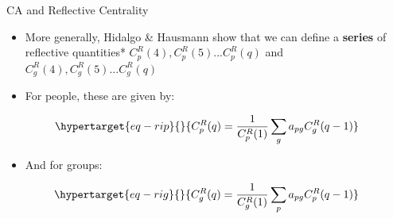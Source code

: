 \documentclass[
  ignorenonframetext,
]{beamer}
\providecommand{\tightlist}{%
  \setlength{\itemsep}{0pt}\setlength{\parskip}{0pt}}\usepackage{longtable,booktabs,array}
\begin{document}
\begin{frame}{CA and Reflective Centrality}
\protect\hypertarget{ca-and-reflective-centrality-5}{}
\begin{itemize}
\item
  More generally, Hidalgo \& Hausmann show that we can define a
  \textbf{series} of reflective quantities*
  \(C^R_p(4), C^R_p(5)...C^R_p(q)\) and
  \(C^R_g(4), C^R_g(5)...C^R_g(q)\)
\item
  For people, these are given by:
\end{itemize}

\begin{equation}\protect\hypertarget{eq-rip}{}{   
C^R_p(q) = \frac{1}{C^R_p(1)}\sum_g a_{pg}C^R_g(q-1) 
}\label{eq-rip}\end{equation}

\begin{itemize}
\tightlist
\item
  And for groups:
\end{itemize}

\begin{equation}\protect\hypertarget{eq-rig}{}{   
C^R_g(q) = \frac{1}{C^R_g(1)}\sum_p a_{pg}C^R_p(q-1)
}\label{eq-rig}\end{equation}

\end{frame}
\end{document}

